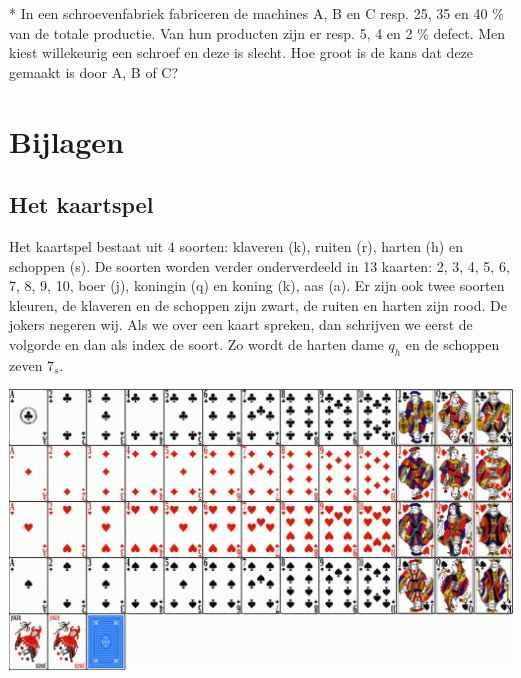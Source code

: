 \documentclass[12pt,twoside]{article}
\begin{document}
\begin{oefening}*
In een schroevenfabriek fabriceren de machines A, B en C resp. 25, 35 en 40 \% van de totale productie. Van hun producten zijn er resp. 5, 4 en 2 \% defect. Men kiest willekeurig een schroef en deze is slecht. Hoe groot is de kans dat deze gemaakt
is door A, B of C?
\end{oefening}

\pagebreak
\appendix
\section*{Bijlagen}

\subsection*{Het kaartspel}
Het kaartspel bestaat uit 4 soorten: klaveren (k), ruiten (r), harten (h) en schoppen (s). De soorten worden verder onderverdeeld in 13 kaarten: 2, 3, 4, 5, 6, 7, 8, 9, 10, boer (j), koningin (q) en koning (k), aas (a). Er zijn ook twee soorten kleuren, de klaveren en de schoppen zijn zwart, de ruiten en harten zijn rood. De jokers negeren wij. Als we over een kaart spreken, dan schrijven we eerst de volgorde en dan als index de soort. Zo wordt de harten dame $q_h$ en de schoppen zeven $7_s$.

\includegraphics[width=\textwidth, angle=0]{kaartspel}


\end{document}
